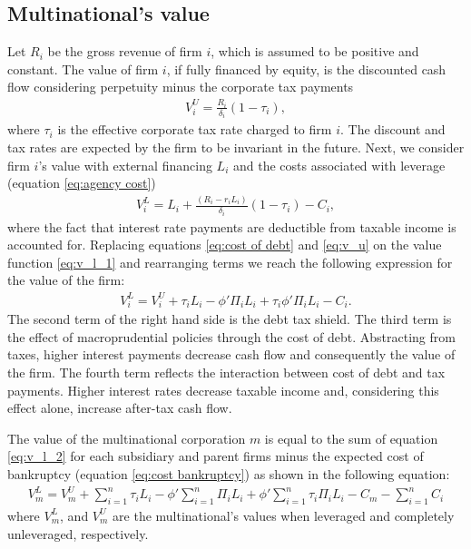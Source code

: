 \documentclass[12pt]{article}
\begin{document}
	\subsection{Multinational's value}
	\label{subsec:value}
	Let $R_i$ be the gross revenue of firm $i$, which is assumed to be positive and constant. The value of firm $i$, if fully financed by equity, is the discounted cash flow considering perpetuity minus the corporate tax payments 
	\begin{equation}
	\begin{aligned}
	V_i^U=\frac{R_i}{\delta_i}(1-\tau_{i}),
	\end{aligned}
	\label{eq:v_u}
	\end{equation}	
	where $\tau_{i}$ is the effective corporate tax rate charged to firm $i$. The discount and tax rates are expected by the firm to be invariant in the future. Next, we consider firm $i$'s value with external financing $L_i$ and the costs associated with leverage (equation \ref{eq:agency cost})
	\begin{equation}
	\begin{aligned}
	V_i^L=L_i+\frac{(R_i-r_iL_i)}{\delta_i}(1-\tau_{i})-C_i,
	\end{aligned}
	\label{eq:v_l_1}
	\end{equation}	
	where the fact that interest rate payments are deductible from taxable income is accounted for. Replacing equations \ref{eq:cost of debt} and \ref{eq:v_u} on the value function \ref{eq:v_l_1} and rearranging terms we reach the following expression for the value of the firm:
	\begin{equation}
	\begin{aligned}
	V_i^L=V_i^U+\tau_{i}L_i-\phi'\Pi_iL_i+\tau_{i}\phi'\Pi_iL_i-C_i.
	\end{aligned}
	\label{eq:v_l_2}
	\end{equation}	
	The second term of the right hand side is the debt tax shield. The third term is the effect of macroprudential policies through the cost of debt. Abstracting from taxes, higher interest payments decrease cash flow and consequently the value of the firm. The fourth term reflects the interaction between cost of debt and tax payments. Higher interest rates decrease taxable income and, considering this effect alone, increase after-tax cash flow.
	
	The value of the multinational corporation $m$ is equal to the sum of equation \ref{eq:v_l_2} for each subsidiary and parent firms minus the expected cost of bankruptcy (equation \ref{eq:cost bankruptcy}) as shown in the following equation:
	\begin{equation}
	\begin{aligned}
	V_m^L=V_m^U+\sum_{i=1}^{n}\tau_iL_i-\phi'\sum_{i=1}^{n}\Pi_iL_i+\phi'\sum_{i=1}^{n}\tau_i\Pi_i L_i-C_m-\sum_{i=1}^{n}C_i
	\end{aligned}
	\label{eq:v_l}
	\end{equation}
	where $V_m^L$, and $V_m^U$ are the multinational's values when leveraged and completely unleveraged, respectively.
\end{document}
